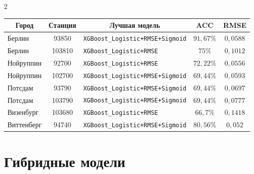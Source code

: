 \begin{multicols}{2}
\begin{table}
\begin{center}
\begin{tabular}{|l|c|l|c|c|}

\hline

\multicolumn{1}{|c|}{{\bf Город}} & 

\multicolumn{1}{c|}{{\bf Станция}} & 

\multicolumn{1}{c|}{{\bf Лучшая модель}} & 

{\bf ACC}& {\bf RMSE} \\

\hline

      Берлин &   \hphantom{9}93850 &  \verb"XGBoost_Logistic+RMSE+Sigmoid" &  $91{,}67\%$ &  $0{,}0588$ \\

      Берлин &  103810 &          \verb"XGBoost_Logistic+RMSE" & $ 75\%$\hphantom{,99} &  $0{,}1012$ \\

   Нойруппин &   \hphantom{9}92700 &          \verb"XGBoost_Logistic+RMSE" &  $72{,}22 \%$& $ 0{,}0556$ \\

   Нойруппин &  102700 &  \verb"XGBoost_Logistic+RMSE+Sigmoid" &  $69{,}44 \%$&  $0{,}0593$ \\

     Потсдам &   \hphantom{9}93790 &  \verb"XGBoost_Logistic+RMSE+Sigmoid" &  $69{,}44\%$ &  $0{,}0697$ \\

     Потсдам &  103790 &  \verb"XGBoost_Logistic+RMSE+Sigmoid" & $69{,}44\%$ &  $0{,}0777$ \\

  Визенбург &  103680 &          \verb"XGBoost_Logistic+RMSE" &  $66{,}7\%$\hphantom{9} &  $0{,}1418$ \\

  Виттенберг &   \hphantom{9}94740 &  \verb"XGBoost_Logistic+RMSE+Sigmoid" &  $80{,}56\%$ &  $0{,}052$\hphantom{9} \\

\hline

\end{tabular}

\end{center}

\end{table}





\section{Гибридные модели}




\end{multicols}
